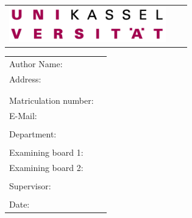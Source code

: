 \begin{titlepage}
	\sffamily

	\begin{tabularx}{\textwidth}{@{}l@{}>{\raggedleft\arraybackslash}X@{}r@{}}
		\multirow{2}{*}{\includegraphics[width=6.8cm]{images/Logo_UniKassel}} &
		\raisebox{-1mm}{\small{\thesisdepartment}} &
	\end{tabularx}

	\vspace{2.5cm}

	\begin{center}
		\huge{\thesistitle}

		\vspace{3cm}

		\renewcommand{\baselinestretch}{1.3}
		\Large{\thesistype}

		\large
		\thesistypedesc
	\end{center}

	\vspace{1.5cm}
	\renewcommand{\baselinestretch}{1}
	\begin{table}[htpb]
		\centering
		\begin{tabular}{ll}
			\\
			Author Name: & \thesisauthorname \\
			Address: & \thesisauthorhomestreet \\
			& \thesisauthorhometown \\
			\\
			Matriculation number: & \thesisauthormatrikelnumber \\
			E-Mail: & \thesisauthoremail \\
			\\
			Department: & \thesisdepartment \\
			\\
			Examining board 1: & \thesisfirstreviewer \\
			Examining board 2: & \thesissecondreviewer \\
			\\
			Supervisor: & \thesissupervisor \\
			\\
			Date: & \thesisdate \\
		\end{tabular}
	\end{table}

	\rmfamily
\end{titlepage}
